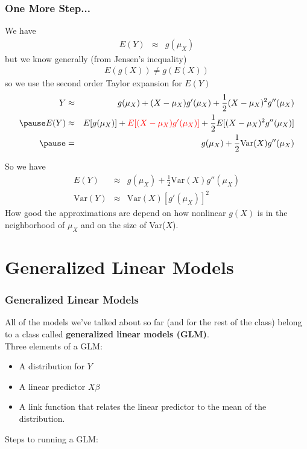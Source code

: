 \documentclass{beamer}
\begin{document}
\begin{frame}
\frametitle{One More Step...}
\pause
We have 
\begin{eqnarray*}
E(Y) &\approx& g(\mu_X)
\end{eqnarray*}
\pause
but we know generally (from Jensen's inequality)
\begin{eqnarray*}
E(g(X)) \neq g(E(X))
\end{eqnarray*} 
\pause
so we use the second order Taylor expansion for $E(Y)$
\pause
\begin{eqnarray*}
Y &\approx& g(\mu_X) + (X - \mu_X) g'(\mu_X) + \frac{1}{2} (X-\mu_X)^2
g''(\mu_X) \\ 
\pause
E(Y) &\approx& E[g(\mu_X)] + \red{E[(X - \mu_X) g'(\mu_X)]} + \frac{1}{2}
E[(X-\mu_X)^2 g''(\mu_X)] \\
\pause
&=& g(\mu_X) + \frac{1}{2} \mathrm{Var}(X) g''(\mu_X)
\end{eqnarray*}
\end{frame}

\begin{frame}
So we have
\begin{eqnarray*}
E(Y) &\approx& g(\mu_X) + \frac{1}{2} \mathrm{Var}(X) g''(\mu_X) \\
\mathrm{Var}(Y) &\approx& \mathrm{Var}(X) [g'(\mu_X)]^2
\end{eqnarray*}
\pause
How good the approximations are depend on how nonlinear $g(X)$ is in
the neighborhood of $\mu_X$ and on the size of Var($X$).
\end{frame}

\section{Generalized Linear Models}

\begin{frame}
\frametitle{Generalized Linear Models}
\pause
All of the models we've talked about so far (and for the rest of the
class) belong to a class called \textbf{generalized linear models (GLM)}.\\
\pause
\bigskip
Three elements of a GLM:
\pause
\begin{itemize}
\item A distribution for $Y$
\pause
\item A linear predictor $X\beta$
\pause
\item A link function that relates the linear predictor to the mean of
the distribution.
\end{itemize}
\pause
\bigskip
Steps to running a GLM:
\end{frame}
\end{document}
